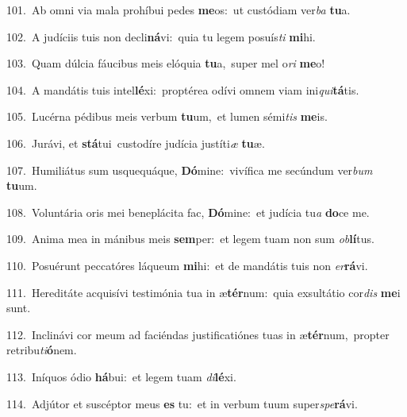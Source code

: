 {\numbfont\textcolor{\numbcolor}{101.}}~Ab omni via mala prohíbui pedes \textbf{me}\-os:~\star ut custódiam ver\textit{ba} \textbf{tu}\-a.\par
{\numbfont\textcolor{\numbcolor}{102.}}~A judíciis tuis non decli\-\textbf{ná}\-vi:~\star quia tu legem posuís\textit{ti} \textbf{mi}\-hi.\par
{\numbfont\textcolor{\numbcolor}{103.}}~Quam dúlcia fáucibus meis elóquia \textbf{tu}\-a,~\star super mel o\textit{ri} \textbf{me}\-o!\par
{\numbfont\textcolor{\numbcolor}{104.}}~A mandátis tuis intel\-\textbf{lé}\-xi:~\star proptérea odívi omnem viam ini\-\textit{qui}\-\textbf{tá}tis.\par
{\numbfont\textcolor{\numbcolor}{105.}}~Lucérna pédibus meis verbum \textbf{tu}\-um,~\star et lumen sémi\textit{tis} \textbf{me}\-is.\par
{\numbfont\textcolor{\numbcolor}{106.}}~Jurávi, et \textbf{stá}\-tui~\star custodíre judícia justíti\textit{æ} \textbf{tu}\-æ.\par
{\numbfont\textcolor{\numbcolor}{107.}}~Humiliátus sum usquequáque, \textbf{Dó}\-mine:~\star vivífica me secúndum ver\textit{bum} \textbf{tu}\-um.\par
{\numbfont\textcolor{\numbcolor}{108.}}~Voluntária oris mei beneplácita fac, \textbf{Dó}\-mine:~\star et judícia tu\textit{a} \textbf{do}\-ce me.\par
{\numbfont\textcolor{\numbcolor}{109.}}~Anima mea in mánibus meis \textbf{sem}\-per:~\star et legem tuam non sum \textit{ob}\-\textbf{lí}tus.\par
{\numbfont\textcolor{\numbcolor}{110.}}~Posuérunt peccatóres láqueum \textbf{mi}\-hi:~\star et de mandátis tuis non \textit{er}\-\textbf{rá}vi.\par
{\numbfont\textcolor{\numbcolor}{111.}}~Hereditáte acquisívi testimónia tua in æ\-\textbf{tér}\-num:~\star quia exsultátio cor\textit{dis} \textbf{me}\-i sunt.\par
{\numbfont\textcolor{\numbcolor}{112.}}~Inclinávi cor meum ad faciéndas justificatiónes tuas in æ\-\textbf{tér}\-num,~\star propter retribu\-\textit{ti}\-\textbf{ó}nem.\par
{\numbfont\textcolor{\numbcolor}{113.}}~Iníquos ódio \textbf{há}\-bui:~\star et legem tuam \textit{di}\-\textbf{lé}xi.\par
{\numbfont\textcolor{\numbcolor}{114.}}~Adjútor et suscéptor meus \textbf{es} tu:~\star et in verbum tuum super\-\textit{spe}\-\textbf{rá}vi.\par
